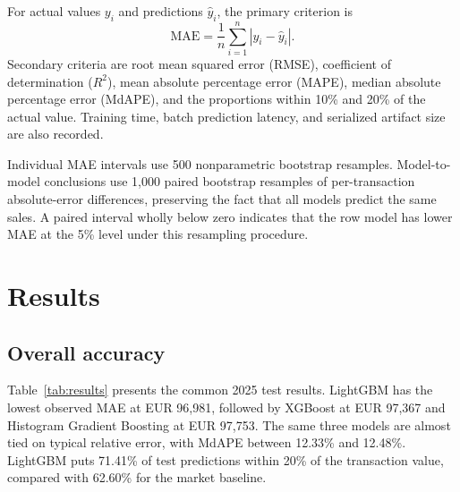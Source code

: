 \documentclass[11pt,a4paper]{article}
\begin{document}
For actual values $y_i$ and predictions $\hat{y}_i$, the primary criterion is
\begin{equation}
\mathrm{MAE}=\frac{1}{n}\sum_{i=1}^{n}|y_i-\hat{y}_i|.
\end{equation}
Secondary criteria are root mean squared error (RMSE), coefficient of
determination ($R^2$), mean absolute percentage error (MAPE), median absolute
percentage error (MdAPE), and the proportions within 10\% and 20\% of the actual
value. Training time, batch prediction latency, and serialized artifact size are
also recorded.

Individual MAE intervals use 500 nonparametric bootstrap resamples. Model-to-
model conclusions use 1,000 paired bootstrap resamples of per-transaction
absolute-error differences, preserving the fact that all models predict the same
sales. A paired interval wholly below zero indicates that the row model has lower
MAE at the 5\% level under this resampling procedure.

\section{Results}

\subsection{Overall accuracy}

Table~\ref{tab:results} presents the common 2025 test results. LightGBM has the
lowest observed MAE at EUR 96,981, followed by XGBoost at EUR 97,367 and
Histogram Gradient Boosting at EUR 97,753. The same three models are almost tied
on typical relative error, with MdAPE between 12.33\% and 12.48\%. LightGBM puts
71.41\% of test predictions within 20\% of the transaction value, compared with
62.60\% for the market baseline.

\begin{table}[htbp]
\centering
\caption{Performance on 28,330 transactions from the common 2025 test cohort.}
\label{tab:results}
\end{table}
\end{document}
